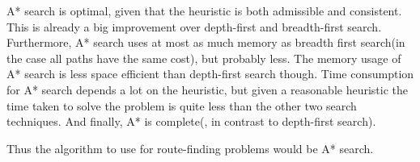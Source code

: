 \documentclass[a4paper]{article}
\begin{document}
A* search is optimal, given that the heuristic is both admissible and consistent. This is already a big improvement over depth-first and breadth-first search. Furthermore, A* search uses at most as much memory as breadth first search(in the case all paths have the same cost), but probably less. The memory usage of A* search is less space efficient than depth-first search though. Time consumption for A* search depends a lot on the heuristic, but given a reasonable heuristic the time taken to solve the problem is quite less than the other two search techniques. And finally, A* is complete(, in contrast to depth-first search).

Thus the algorithm to use for route-finding problems would be A* search.
\end{document}
